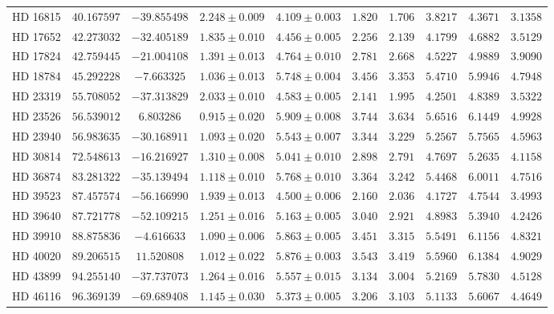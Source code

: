 \documentclass[linenumbers,trackchanges]{aastex701}
\begin{document}
\begin{table}[htbp]
\begin{tabular}{lccccccccc}
HD 16815 & $40.167597$ & $-39.855498$ & $2.248 \pm 0.009$ & $4.109 \pm 0.003$ & $1.820$ & $1.706$ & $3.8217$ & $4.3671$ & $3.1358$ \\
HD 17652 & $42.273032$ & $-32.405189$ & $1.835 \pm 0.010$ & $4.456 \pm 0.005$ & $2.256$ & $2.139$ & $4.1799$ & $4.6882$ & $3.5129$ \\
HD 17824 & $42.759445$ & $-21.004108$ & $1.391 \pm 0.013$ & $4.764 \pm 0.010$ & $2.781$ & $2.668$ & $4.5227$ & $4.9889$ & $3.9090$ \\
HD 18784 & $45.292228$ & $-7.663325$ & $1.036 \pm 0.013$ & $5.748 \pm 0.004$ & $3.456$ & $3.353$ & $5.4710$ & $5.9946$ & $4.7948$ \\
HD 23319 & $55.708052$ & $-37.313829$ & $2.033 \pm 0.010$ & $4.583 \pm 0.005$ & $2.141$ & $1.995$ & $4.2501$ & $4.8389$ & $3.5322$ \\
HD 23526 & $56.539012$ & $6.803286$ & $0.915 \pm 0.020$ & $5.909 \pm 0.008$ & $3.744$ & $3.634$ & $5.6516$ & $6.1449$ & $4.9928$ \\
HD 23940 & $56.983635$ & $-30.168911$ & $1.093 \pm 0.020$ & $5.543 \pm 0.007$ & $3.344$ & $3.229$ & $5.2567$ & $5.7565$ & $4.5963$ \\
HD 30814 & $72.548613$ & $-16.216927$ & $1.310 \pm 0.008$ & $5.041 \pm 0.010$ & $2.898$ & $2.791$ & $4.7697$ & $5.2635$ & $4.1158$ \\
HD 36874 & $83.281322$ & $-35.139494$ & $1.118 \pm 0.010$ & $5.768 \pm 0.010$ & $3.364$ & $3.242$ & $5.4468$ & $6.0011$ & $4.7516$ \\
HD 39523 & $87.457574$ & $-56.166990$ & $1.939 \pm 0.013$ & $4.500 \pm 0.006$ & $2.160$ & $2.036$ & $4.1727$ & $4.7544$ & $3.4993$ \\
HD 39640 & $87.721778$ & $-52.109215$ & $1.251 \pm 0.016$ & $5.163 \pm 0.005$ & $3.040$ & $2.921$ & $4.8983$ & $5.3940$ & $4.2426$ \\
HD 39910 & $88.875836$ & $-4.616633$ & $1.090 \pm 0.006$ & $5.863 \pm 0.005$ & $3.451$ & $3.315$ & $5.5491$ & $6.1156$ & $4.8321$ \\
HD 40020 & $89.206515$ & $11.520808$ & $1.012 \pm 0.022$ & $5.876 \pm 0.003$ & $3.543$ & $3.419$ & $5.5960$ & $6.1384$ & $4.9029$ \\
HD 43899 & $94.255140$ & $-37.737073$ & $1.264 \pm 0.016$ & $5.557 \pm 0.015$ & $3.134$ & $3.004$ & $5.2169$ & $5.7830$ & $4.5128$ \\
HD 46116 & $96.369139$ & $-69.689408$ & $1.145 \pm 0.030$ & $5.373 \pm 0.005$ & $3.206$ & $3.103$ & $5.1133$ & $5.6067$ & $4.4649$ \\

\end{tabular}
\end{table}
\end{document}
